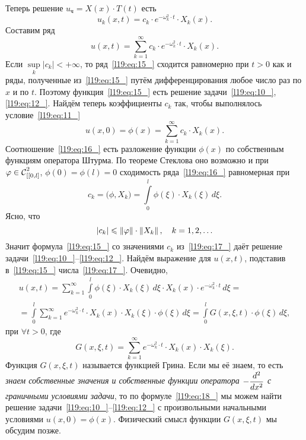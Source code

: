 Теперь решение $u_{\text{ч}}=X(x)\cdot T(t)$ есть 
\begin{equation*}
	 u_k(x,t)=c_k\cdot e^{-\omega_k^2\cdot t}\cdot X_k(x).
\end{equation*}
Составим ряд
\begin{equation}\label{l19:eq:15_}
	 u(x,t)=\sum\limits_{k=1}^{\infty}c_k\cdot e^{-\omega_k^2\cdot t}\cdot X_k(x).
\end{equation}
Если $\sup\limits_k|c_k|<+\infty$, то ряд~\eqref{l19:eq:15_} сходится равномерно при $t>0$ как и ряды, полученные из~\eqref{l19:eq:15_} путём дифференцирования любое число раз по $x$ и по $t$. Поэтому функция~\eqref{l19:eq:15_} есть решение задачи~\eqref{l19:eq:10_}, \eqref{l19:eq:12_}. Найдём теперь коэффициенты $c_k$ так, чтобы выполнялось условие~\eqref{l19:eq:11_}
\begin{equation}\label{l19:eq:16_}
	 u(x,0)=\phi(x)=\sum\limits_{k=1}^{\infty}c_k\cdot X_k(x).
\end{equation} 
Соотношение~\eqref{l19:eq:16_} есть разложение функции $\phi(x)$ по собственным функциям оператора Штурма. По теореме Стеклова оно возможно и при $\phi\in\Cfn[[{[0,l]}]{2}$, $\phi(0)=\phi(l)=0$ сходимость ряда~\eqref{l19:eq:16_} равномерная при
\begin{equation}\label{l19:eq:17_}
	 c_k=\big(\phi, X_k\big)=\int\limits_0^l\phi(\xi)\cdot X_k(\xi)\,d\xi.
\end{equation} 
Ясно, что 
\begin{equation*}
	 |c_k|\leqslant\norm{\phi}\cdot\norm{X_k},\quad k=1,2,\ldots
\end{equation*}
Значит формула~\eqref{l19:eq:15_} со значениями $c_k$ из~\eqref{l19:eq:17_} даёт решение задачи~\eqref{l19:eq:10_}--\eqref{l19:eq:12_}. Найдём выражение для $u(x,t)$,  подставив в~\eqref{l19:eq:15_} числа~\eqref{l19:eq:17_}. Очевидно,
\begin{multline}\label{l19:eq:18_}
	u(x,t)=\sum\limits_{k=1}^{\infty}\int\limits_0^l\phi(\xi)\cdot X_k(\xi)\,d\xi\cdot X_k(x)\cdot e^{-\omega_k^2\cdot t}\,d\xi=\\
	=\int\limits_0^l\sum\limits_{k=1}^{\infty}e^{-\omega_k^2\cdot t}\cdot X_k(x)\cdot X_k(\xi)\cdot\phi(\xi)\,d\xi=\int\limits_0^l G(x,\xi,t)\cdot\phi(\xi)\,d\xi,
\end{multline}
при $\forall t>0$, где 
\begin{equation}\label{l19:eq:19_}
	 G(x,\xi,t)=\sum\limits_{k=1}^{\infty}e^{-\omega_k^2\cdot t}\cdot X_k(x)\cdot X_k(\xi).
\end{equation}
Функция $G(x,\xi,t)$ называется функцией Грина. Если мы её знаем, то есть \emph{знаем собственные значения и собственные функции оператора $\displaystyle-\dder{}{x}$ с граничными условиями задачи}, то по формуле~\eqref{l19:eq:18_} мы можем найти решение задачи~\eqref{l19:eq:10_}--\eqref{l19:eq:12_} с произвольными начальными условиями $u(x,0)=\phi(x)$. Физический смысл функции $G(x,\xi,t)$ мы обсудим позже. 

